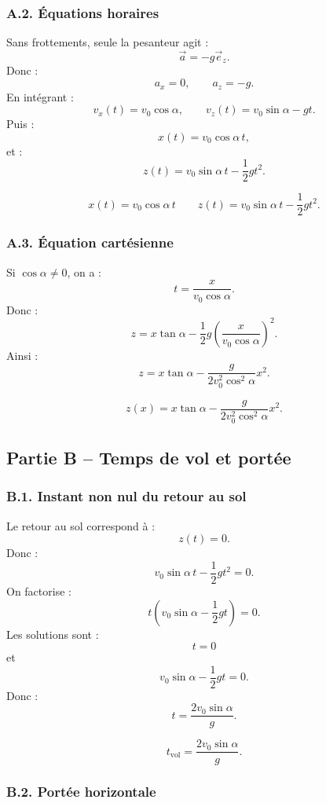 \documentclass[11pt,a4paper]{article}
\begin{document}
\subsubsection*{A.2. Équations horaires}

Sans frottements, seule la pesanteur agit :
\[
\vec a=-g\vec e_z.
\]
Donc :
\[
a_x=0,\qquad a_z=-g.
\]
En intégrant :
\[
v_x(t)=v_0\cos\alpha,
\qquad
v_z(t)=v_0\sin\alpha-gt.
\]
Puis :
\[
x(t)=v_0\cos\alpha\,t,
\]
et :
\[
z(t)=v_0\sin\alpha\,t-\frac12gt^2.
\]

\begin{resultatbox}
\[
\boxed{x(t)=v_0\cos\alpha\,t}
\qquad
\boxed{z(t)=v_0\sin\alpha\,t-\frac12gt^2.}
\]
\end{resultatbox}

\subsubsection*{A.3. Équation cartésienne}

Si $\cos\alpha\neq 0$, on a :
\[
t=\frac{x}{v_0\cos\alpha}.
\]
Donc :
\[
z=x\tan\alpha-\frac12g\left(\frac{x}{v_0\cos\alpha}\right)^2.
\]
Ainsi :
\[
z=x\tan\alpha-\frac{g}{2v_0^2\cos^2\alpha}x^2.
\]

\begin{resultatbox}
\[
\boxed{z(x)=x\tan\alpha-\frac{g}{2v_0^2\cos^2\alpha}x^2.}
\]
\end{resultatbox}

\subsection{Partie B -- Temps de vol et portée}

\subsubsection*{B.1. Instant non nul du retour au sol}

Le retour au sol correspond à :
\[
z(t)=0.
\]
Donc :
\[
v_0\sin\alpha\,t-\frac12gt^2=0.
\]
On factorise :
\[
t\left(v_0\sin\alpha-\frac12gt\right)=0.
\]
Les solutions sont :
\[
t=0
\]
et
\[
v_0\sin\alpha-\frac12gt=0.
\]
Donc :
\[
t=\frac{2v_0\sin\alpha}{g}.
\]

\begin{resultatbox}
\[
\boxed{t_{\text{vol}}=\frac{2v_0\sin\alpha}{g}.}
\]
\end{resultatbox}

\subsubsection*{B.2. Portée horizontale}
\end{document}
